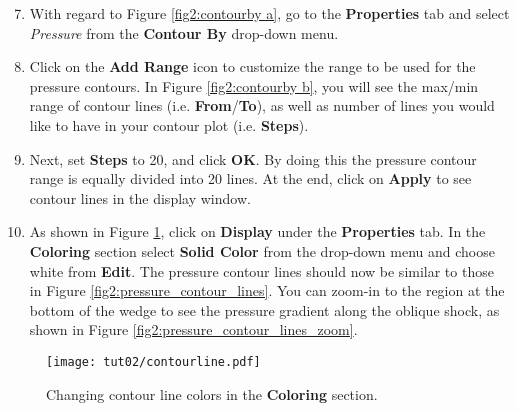 \begin{enumerate}[label=\arabic*)]
	\setcounter{enumi}{6}
	\item With regard to Figure \ref{fig2:contourby a}, go to the \textbf{Properties} tab and select \textit{Pressure} from the \textbf{Contour By} drop-down menu.
	\item Click on the \textbf{Add Range} icon to customize the range to be used for the pressure contours. In Figure \ref{fig2:contourby b}, you will see the max/min range of contour lines (i.e. \textbf{From}/\textbf{To}), as well as number of lines you would like to have in your contour plot (i.e. \textbf{Steps}).
	\item Next, set \textbf{Steps} to 20, and click \textbf{OK}. By doing this the pressure contour range is equally divided into 20 lines. At the end, click on \textbf{Apply} to see contour lines in the display window.
	\item As shown in Figure \ref{fig2:colorby2}, click on \textbf{Display} under the \textbf{Properties} tab. In the \textbf{Coloring} section select \textbf{Solid Color} from the drop-down menu and choose white from \textbf{Edit}. The pressure contour lines should now be similar to those in Figure \ref{fig2:pressure_contour_lines}. You can zoom-in to the region at the bottom of the wedge to see the pressure gradient along the oblique
	shock, as shown in Figure \ref{fig2:pressure_contour_lines_zoom}.
\end{enumerate}





\begin{figure}[ht]
    \centering
    \texttt{[image: tut02/contourline.pdf]}
    \caption{Changing contour line colors in the \textbf{Coloring} section.}
    \label{fig2:colorby2}
\end{figure}

